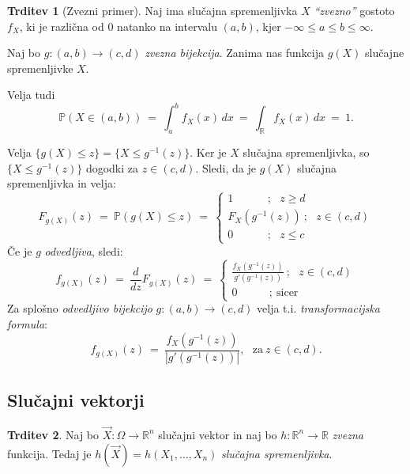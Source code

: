 \documentclass[11pt]{article}
\newcommand{\p}{\mathbb{P}}
\newcommand{\R}{\mathbb{R}}
\newcommand{\1}{\mathbbm{1}}
\theoremstyle{definition}
\theoremstyle{definition}
\newtheorem{trditev}{Trditev}[section]
\theoremstyle{definition}
\begin{document}
\begin{trditev}[Zvezni primer]

Naj ima slučajna spremenljivka $X$ \textit{``zvezno''} gostoto $f_X$, ki je različna od $0$ natanko na intervalu $(a, b)$, kjer $-\infty \leq a \leq b \leq \infty$. 

Naj bo $g: (a, b) \rightarrow (c, d)$ \textit{zvezna bijekcija}. Zanima nas funkcija $g(X)$ slučajne spremenljivke $X$.

Velja tudi
$$\p(X \in (a, b)) ~=~ \int_a^b f_X (x)\,dx ~=~ \int_{\R} f_X (x)\,dx ~=~ 1.$$

Velja $\{ g(X) \leq z \} = \{ X \leq g^{-1}(z) \}$. Ker je $X$ slučajna spremenljivka, so  $\{ X \leq g^{-1}(z) \}$ dogodki za $z \in (c, d).$ Sledi, da je $g(X)$ slučajna spremenljivka in velja:
$$F_{g(X)}(z) ~=~ \p(g(X) \leq z) ~=~ \begin{cases}
1~~~~~~~~~~~~~~; ~~~z \geq d \\
F_X(g^{-1}(z))~; ~~~z \in (c, d) \\
0~~~~~~~~~~~~~~; ~~~z \leq c
\end{cases}$$
Če je $g$ \textit{odvedljiva}, sledi:
$$f_{g(X)}(z) ~=~ \frac{d}{dz} F_{g(X)}(z)  ~=~ \begin{cases}
\frac{f_X(g^{-1}(z))}{g'(g^{-1}(z))}~; ~~~z \in (c, d) \\
0~~~~~~~~~~~~~; ~\text{sicer}
\end{cases}$$
Za splošno \textit{odvedljivo bijekcijo} $g: (a, b) \rightarrow (c, d)$ velja t.i. \textit{transformacijska formula}:
$$f_{g(X)}(z) ~=~ \frac{f_X(g^{-1}(z))}{|g'(g^{-1}(z))|}, ~~~\text{za}~ z \in (c, d).$$
 
\end{trditev}
\vspace{0.5cm}


\subsection{Slučajni vektorji}
\vspace{0.5cm}

\begin{trditev}

Naj bo $\vec{X}: \Omega \rightarrow \R^n$ slučajni vektor in naj bo $h: \R^n \rightarrow \R$ \textit{zvezna} funkcija. Tedaj je $h(\vec{X}) = h(X_1, \ldots, X_n)$ \textit{slučajna spremenljivka}.

\end{trditev}
\vspace{0.5cm}
\end{document}
